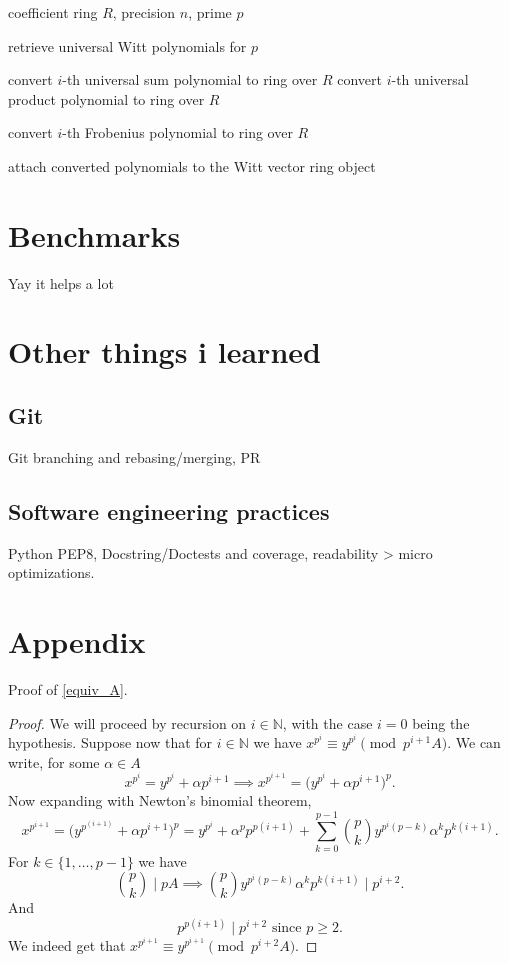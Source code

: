 \documentclass[oneside, a4paper, onecolumn, 11pt]{article}
\theoremstyle{definition}
\begin{document}
\begin{algorithm}[H]
\caption{Use of cached universal polynomials}
\begin{algorithmic}[1]
\Require coefficient ring $R$, precision $n$, prime $p$

\State retrieve universal Witt polynomials for $p$

    \State convert $i$-th universal sum polynomial to ring over $R$
    \State convert $i$-th universal product polynomial to ring over $R$
\EndFor

    \State convert $i$-th Frobenius polynomial to ring over $R$
\EndFor

\State attach converted polynomials to the Witt vector ring object
\end{algorithmic}
\end{algorithm}

\section{Benchmarks}
Yay it helps a lot

\section{Other things i learned}
\subsection{Git}
Git branching and rebasing/merging, PR
\subsection{Software engineering practices}
Python PEP8, Docstring/Doctests and coverage, readability > micro optimizations.

\newpage


\newpage



\newpage
\appendix

\section{Appendix}
\label{sec:appendix}
Proof of \ref{equiv_A}.
\begin{proof}
  We will proceed by recursion on $i\in\mathbb{N}$, with the case $i=0$ being the hypothesis.
  Suppose now that for $i\in\mathbb{N}$ we have $x^{p^i}\equiv y^{p^i} \pmod {p^{i+1}A}$. We can write, for some $\alpha \in A $ \[x^{p^i}=y^{p^i}+\alpha p^{i+1}\implies x^{p^{i+1}}=\bigl(y^{p^i}+\alpha p^{i+1}\bigr)^p.\]
  Now expanding with Newton's binomial theorem, \[x^{p^{i+1}}=\bigl(y^{p^(i+1)}+\alpha p^{i+1}\bigr)^p=y^{p^i}+\alpha^p p^{p(i+1)}+\sum_{k=0}^{p-1}\binom{p}{k}y^{p^{i}(p-k)}\alpha^k p^{k(i+1)}.\]
  For $k\in\{1,\ldots,p-1\}$ we have \[\binom{p}{k}\mid pA \implies \binom{p}{k}y^{p^{i}(p-k)}\alpha^k p^{k(i+1)}\mid p^{i+2}.\]
  And \[p^{p(i+1)}\mid p^{i+2} \text{ since }p\geq 2.\]
  We indeed get that $x^{p^{i+1}}\equiv y^{p^{i+1}} \pmod {p^{i+2}A}$.
\end{proof}
\end{document}
